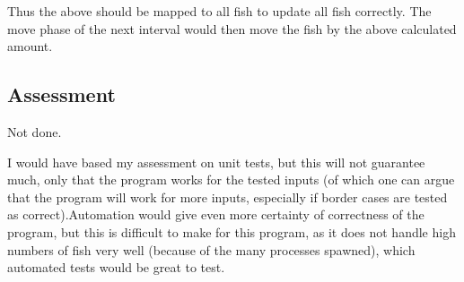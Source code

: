 \documentclass[a4paper, 10pt]{article}
\begin{document}
Thus the above should be mapped to all fish to update all fish correctly. The move phase of the next interval would then move the fish by the above calculated amount.

\subsection*{Assessment}
Not done.

I would have based my assessment on unit tests, but this will not guarantee much, only that the program works for the tested inputs (of which one can argue that the program will work for more inputs, especially if border cases are tested as correct).Automation would give even more certainty of correctness of the program, but this is difficult to make for this program, as it does not handle high numbers of fish very well (because of the many processes spawned), which automated tests would be great to test.
\end{document}
